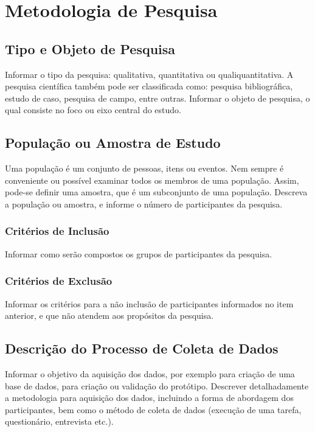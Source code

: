 \chapter{Metodologia de Pesquisa}
\label{cap:metodologia}

\section{Tipo e Objeto de Pesquisa}
\label{sec:tipo_e_Obj}

Informar o tipo da pesquisa: qualitativa, quantitativa ou qualiquantitativa. A pesquisa científica também pode ser classificada como: pesquisa bibliográfica, estudo de caso, pesquisa de campo, entre outras. Informar o objeto de pesquisa, o qual consiste no foco ou eixo central do estudo.

\section{População ou Amostra de Estudo}
\label{sec:amostra}

Uma população é um conjunto de pessoas, itens ou eventos. Nem sempre é conveniente ou possível examinar todos os membros de uma população. Assim, pode-se definir uma amostra, que é um subconjunto de uma população. Descreva a população ou amostra, e informe o número de participantes da pesquisa.

\subsection{Critérios de Inclusão}

Informar como serão compostos os grupos de participantes da pesquisa.

\subsection{Critérios de Exclusão}

Informar os critérios para a não inclusão de participantes informados no item anterior, e que não atendem aos propósitos da pesquisa.

\section{Descrição do Processo de Coleta de Dados}
\label{sec:coleta}

Informar o objetivo da aquisição dos dados, por exemplo para criação de uma base de dados, para criação ou validação do protótipo. Descrever detalhadamente a metodologia para aquisição dos dados, incluindo a forma de abordagem dos participantes, bem como o método de coleta de dados (execução de uma tarefa, questionário, entrevista etc.).

